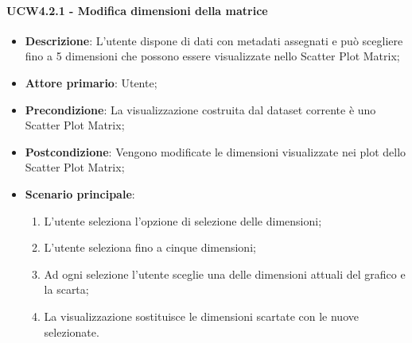 \paragraph{UCW4.2.1 - Modifica dimensioni della matrice}
\label{par:ucw4.2.1}
\begin{itemize}
    \item \textbf{Descrizione}:     L’utente dispone di dati con metadati assegnati e può
                                    scegliere fino a 5 dimensioni che possono essere visualizzate nello Scatter Plot
                                    Matrix;

    \item \textbf{Attore primario}: Utente;

    \item \textbf{Precondizione}:   La visualizzazione costruita dal dataset corrente è uno Scatter Plot Matrix;
    \item \textbf{Postcondizione}:  Vengono modificate le dimensioni visualizzate nei plot dello Scatter Plot Matrix;

	\item \textbf{Scenario principale}:
        \begin{enumerate}
            \item   L'utente seleziona l'opzione di selezione delle dimensioni;
            \item   L'utente seleziona fino a cinque dimensioni;

            \item   Ad ogni selezione l'utente
                    sceglie una delle dimensioni attuali del grafico e la scarta;

            \item   La visualizzazione sostituisce le dimensioni scartate con le nuove selezionate.
        \end{enumerate}
\end{itemize}

